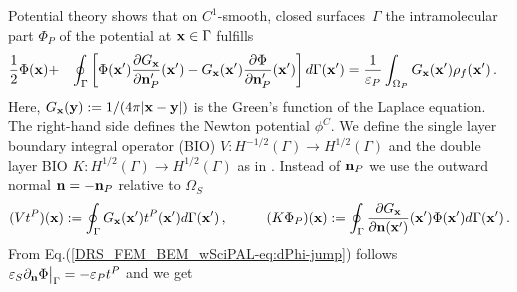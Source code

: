 \documentclass[runningheads]{lncse}
\newcommand{\mydiff}[2]{{}{#2}}
\begin{document}
\mydiff{new paragraph}{
Potential theory shows that on $C^1$-smooth, closed surfaces~$\Gamma$ the intramolecular 
part $\Phi_P$ of the potential at ${\bf x} \in \Gamma$ fulfills
% 
\begin{eqnarray*}
\label{DRS_FEM_BEM_wSciPAL-eq:phi-at-gamma-ps}
\frac 1 2 \Phi ({\bf x})  & + &
\oint_{\Gamma}
\left[
\Phi ({\bf x}' ) \frac{\partial G_{\bf x} }{\partial{\bf n}'_P}({\bf x}') 
 - 
 G_{\bf x}({\bf x}')  %
    \frac{\partial \Phi}{\partial{\bf n}'_P} ({\bf x}')   \right] 
 d\Gamma ({\bf x}')  
  =  \frac{1}{\varepsilon_P}  \int_{\Omega_P}  G_{\bf x}({\bf x}')  \rho_f({\bf x}')  \,.
  \quad 
\end{eqnarray*}
% 
Here, $G_{\bf x}({\bf y}) := 1 / (4 \pi |  {\bf x} - {\bf y} | )  $
%
is the Green's function of the Laplace equation. %
The right-hand side defines the Newton potential $\phi^C$. %
%
%
We define the single layer boundary integral operator (BIO) $V : H^{-1/2}(\Gamma) \to H^{1/2}(\Gamma) $ and the double layer BIO $K : H^{1/2}(\Gamma) \to H^{1/2}(\Gamma) $ as
in \cite[Secs. 6.2 and 6.4]{steinbach2007numerical}.
Instead of ${\bf n}_P$ we use the outward normal ${\bf n} = -{\bf n}_P$ relative to $\Omega_S$
% 
\begin{eqnarray*}
(V t^P)({\bf x})  :=  \oint_{\Gamma}
 G_{\bf x}({\bf x}')  %
     t^P({\bf x}')
 d\Gamma ({\bf x}')  \,,& ~~~~~~& 
%
(K \Phi_P)({\bf x})  :=  %
\oint_{\Gamma}
\frac{\partial G_{\bf x} }{\partial{\bf n}({\bf x}') }({\bf x}') 
     \Phi({\bf x}')
 d\Gamma ({\bf x}')  \,.
\end{eqnarray*}
%
}
From Eq.(\ref{DRS_FEM_BEM_wSciPAL-eq:dPhi-jump}) follows
%
% 
$
\varepsilon_S  \partial_{\bf n} \Phi \big|_{\Gamma} = -\varepsilon_P  t^P $ and we get
\end{document}
